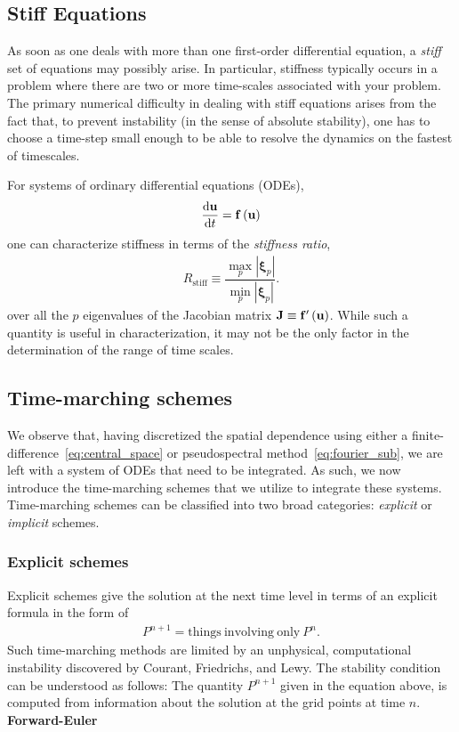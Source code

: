 \documentclass[10pt]{article}
\begin{document}
\subsection{Stiff Equations}

As soon as one deals with more than one first-order differential equation, a \emph{stiff} set of equations may possibly arise. In particular, stiffness typically occurs in a problem where there are two or more time-scales associated with your problem. The primary numerical difficulty in dealing with stiff equations arises from the fact that, to prevent instability (in the sense of absolute stability), one has to choose a time-step small enough to be able to resolve the dynamics on the fastest of timescales. 

For systems of ordinary differential equations (ODEs), 
\begin{align}
    \dv{\vb{u}}{t} = \vb{f}\left(\vb{u}\right)
\end{align}
one can characterize stiffness in terms of the \emph{stiffness ratio},
\begin{align}
    R_{\mathrm{stiff}} \equiv \dfrac{\max\limits_{p}|\bm{\xi}_{p}|}{\min\limits_{p}|\bm{\xi}_{p}|}.
\end{align}
over all the $p$ eigenvalues of the Jacobian matrix $\vb{J}\equiv \vb{f}^{\prime}\left(\vb{u}\right)$.
While such a quantity is useful in characterization, it may not be the only factor in the determination of the range of time scales. 

\subsection{Time-marching schemes}

We observe that, having discretized the spatial dependence using either a finite-difference~\eqref{eq:central_space} or pseudospectral method~\eqref{eq:fourier_sub}, we are left with a system of ODEs that need to be integrated. As such, we now introduce the time-marching schemes that we utilize to integrate these systems. Time-marching schemes can be classified into two broad categories: \emph{explicit} or \emph{implicit} schemes. 

\subsubsection{Explicit schemes}
Explicit schemes give the solution at the next time level in terms of an explicit formula in the form of
\begin{align}
    P^{n+1} = \mathrm{things\ involving\ only\ }P^{n}.
\end{align}
Such time-marching methods are limited by an unphysical, computational instability discovered by Courant, Friedrichs, and Lewy.
The stability condition can be understood as follows: The quantity $P^{n+1}$ given in the equation above, is computed from information about the solution at the grid points at time $n$.  
\newline\newline
\textbf{Forward-Euler}
\end{document}
